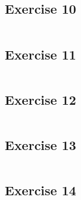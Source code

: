 \documentclass[11pt]{article}
\begin{document}
\subsection{Exercise 10}
\inputminted[linenos,breaklines,fontsize=\small]{R}{RCode/10_Exercise10.R}

\subsection{Exercise 11}
\inputminted[linenos,breaklines,fontsize=\small]{R}{RCode/11_Exercise11.R}

\subsection{Exercise 12}
\inputminted[linenos,breaklines,fontsize=\small]{R}{RCode/12_Exercise12.R}

\subsection{Exercise 13}
\inputminted[linenos,breaklines,fontsize=\small]{R}{RCode/13_Exercise13.R}

\subsection{Exercise 14}
\inputminted[linenos,breaklines,fontsize=\small]{R}{RCode/14_Exercise14.R}
\end{document}
